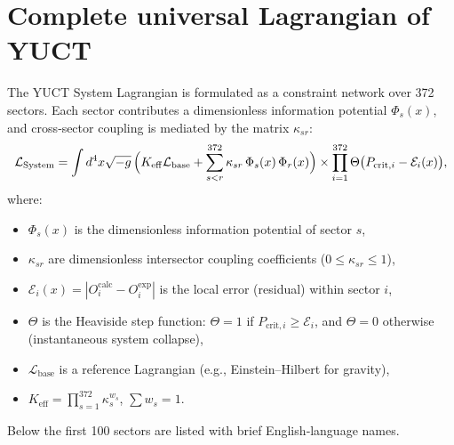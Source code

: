 \documentclass[12pt,a4paper]{article}
\begin{document}
	\section{Complete universal Lagrangian of YUCT}
	The YUCT System Lagrangian is formulated as a constraint network over 372 sectors.
	Each sector contributes a dimensionless information potential $\Phi_s(x)$,
	and cross‑sector coupling is mediated by the matrix $\kappa_{sr}$:
	\begin{equation}
		\mathcal{L}_{\text{System}} = \int d^4x\sqrt{-g}\,
		\Bigl( K_{\mathrm{eff}} \mathcal{L}_{\text{base}}
		+ \sum_{s<r}^{372} \kappa_{sr}\, \Phi_s(x)\, \Phi_r(x) \Bigr)
		\times \prod_{i=1}^{372} \Theta\bigl( P_{\text{crit},i} - \mathcal{E}_i(x) \bigr),
	\end{equation}
	where:
	\begin{itemize}
		\item $\Phi_s(x)$ is the dimensionless information potential of sector $s$,
		\item $\kappa_{sr}$ are dimensionless intersector coupling coefficients ($0 \le \kappa_{sr} \le 1$),
		\item $\mathcal{E}_i(x) = |O_i^{\text{calc}} - O_i^{\text{exp}}|$ is the local error (residual) within sector $i$,
		\item $\Theta$ is the Heaviside step function: $\Theta = 1$ if $P_{\text{crit},i} \ge \mathcal{E}_i$, and $\Theta = 0$ otherwise (instantaneous system collapse),
		\item $\mathcal{L}_{\text{base}}$ is a reference Lagrangian (e.g., Einstein–Hilbert for gravity),
		\item $K_{\mathrm{eff}} = \prod_{s=1}^{372} \kappa_s^{w_s}$, $\sum w_s = 1$.
	\end{itemize}
	Below the first 100 sectors are listed with brief English‑language names.
	\scriptsize
\end{document}
